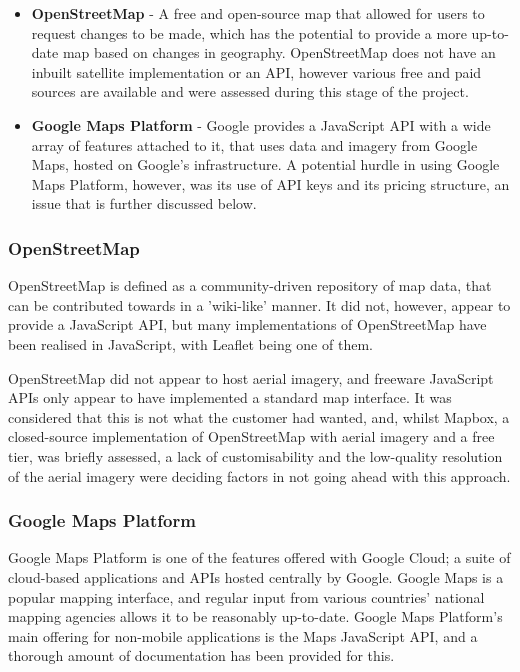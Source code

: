\begin{itemize}
\item	\textbf{OpenStreetMap} - A free and open-source map that allowed for users to request changes to be made, which has the potential to provide a more up-to-date map based on changes in geography. OpenStreetMap does not have an inbuilt satellite implementation or an API, however various free and paid sources are available and were assessed during this stage of the project.
\item	\textbf{Google Maps Platform} - Google provides a JavaScript API with a wide array of features attached to it, that uses data and imagery from Google Maps, hosted on Google's infrastructure. A potential hurdle in using Google Maps Platform, however, was its use of API keys and its pricing structure, an issue that is further discussed below.
\end{itemize}

\subsubsection{OpenStreetMap}

OpenStreetMap is defined as a community-driven repository of map data, that can be contributed towards in a 'wiki-like' manner\cite{OpenStreetMap}. It did not, however, appear to provide a JavaScript API, but many implementations of OpenStreetMap have been realised in JavaScript, with Leaflet being one of them\cite{Leaflet}.

OpenStreetMap did not appear to host aerial imagery, and freeware JavaScript APIs only appear to have implemented a standard map interface. It was considered that this is not what the customer had wanted, and, whilst Mapbox, a closed-source implementation of OpenStreetMap with aerial imagery and a free tier, was briefly assessed, a lack of customisability and the low-quality resolution of the aerial imagery were deciding factors in not going ahead with this approach\cite{Mapbox}.

\subsubsection{Google Maps Platform}
\label{sec:googlemaps}

Google Maps Platform is one of the features offered with Google Cloud; a suite of cloud-based applications and APIs hosted centrally by Google. Google Maps is a popular mapping interface, and regular input from various countries' national mapping agencies allows it to be reasonably up-to-date. Google Maps Platform's main offering for non-mobile applications is the Maps JavaScript API, and a thorough amount of documentation has been provided for this\cite{GoogleMaps}.

